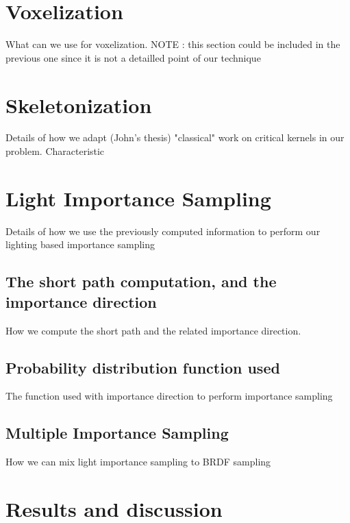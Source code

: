 \section{Voxelization}

What can we use for voxelization. 
NOTE : this section could be included in the previous one since it is not a detailled point of our technique

\section{Skeletonization}

Details of how we adapt (John's thesis) "classical" work on critical kernels in our problem. Characteristic 

\section{Light Importance Sampling}

Details of how we use the previously computed information to perform our lighting based importance sampling

\subsection{The short path computation, and the importance direction}

How we compute the short path and the related importance direction.

\subsection{Probability distribution function used}

The function used with importance direction to perform importance sampling

\subsection{Multiple Importance Sampling}

How we can mix light importance sampling to BRDF sampling

\section{Results and discussion}

